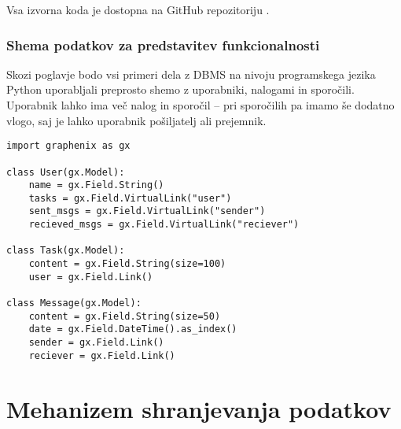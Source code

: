 \documentclass[a4paper,12pt,openright]{book}
\begin{document}
    Vsa izvorna koda je dostopna na GitHub repozitoriju \cite{GRAPHENIX_GITHUB}.

    \subsubsection{Shema podatkov za predstavitev funkcionalnosti}
    Skozi poglavje bodo vsi primeri dela z DBMS na nivoju programskega jezika Python uporabljali preprosto shemo z uporabniki, nalogami in sporočili. Uporabnik lahko ima več nalog in sporočil – pri sporočilih pa imamo še dodatno vlogo, saj je lahko uporabnik pošiljatelj ali prejemnik.


\newpage
\begin{verbatim}
import graphenix as gx

class User(gx.Model):
    name = gx.Field.String()
    tasks = gx.Field.VirtualLink("user")
    sent_msgs = gx.Field.VirtualLink("sender")
    recieved_msgs = gx.Field.VirtualLink("reciever")

class Task(gx.Model):
    content = gx.Field.String(size=100)
    user = gx.Field.Link()

class Message(gx.Model):
    content = gx.Field.String(size=50)
    date = gx.Field.DateTime().as_index()
    sender = gx.Field.Link()
    reciever = gx.Field.Link()
\end{verbatim}
    
    \section{Mehanizem shranjevanja podatkov}
\end{document}
